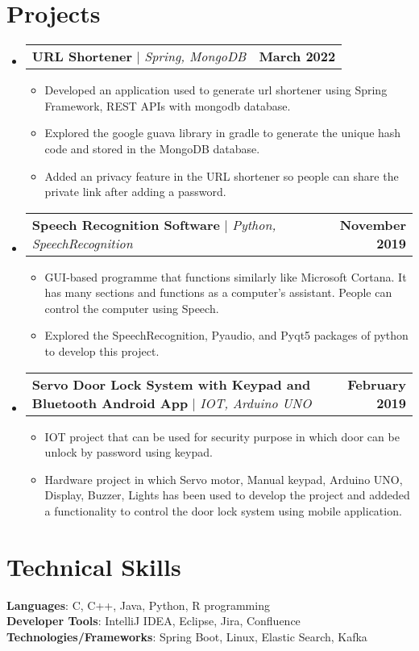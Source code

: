 \documentclass[letterpaper,11pt]{article}
\makeatletter
\newcommand{\resumeItem}[1]{
  \item\small{
    {#1 \vspace{-2pt}}
  }
}
\newcommand{\resumeProjectHeading}[2]{
    \item
    \begin{tabular*}{1.001\textwidth}{l@{\extracolsep{\fill}}r}
      \small#1 & \textbf{\small #2}\\
    \end{tabular*}\vspace{-7pt}
}
\newcommand{\resumeSubHeadingListStart}{\begin{itemize}[leftmargin=0.0in, label={}]}
\newcommand{\resumeSubHeadingListEnd}{\end{itemize}}
\newcommand{\resumeItemListStart}{\begin{itemize}}
\newcommand{\resumeItemListEnd}{\end{itemize}\vspace{-5pt}}
\makeatother
\begin{document}
\section{Projects}
    \vspace{-5pt}
    \resumeSubHeadingListStart
      \resumeProjectHeading
          {\textbf{URL Shortener} $|$ \emph{Spring, MongoDB}}{March 2022}
          \resumeItemListStart
            \resumeItem{Developed an application used to generate url shortener using Spring Framework, REST APIs with mongodb database.}
            \resumeItem{Explored the google guava library in gradle to generate the unique hash code and stored in the MongoDB database.}
            \resumeItem{Added an privacy feature in the URL shortener so people can share the private link after adding a password.}
          \resumeItemListEnd
          \vspace{-13pt}
      \resumeProjectHeading
          {\textbf{Speech Recognition Software} $|$ \emph{Python, SpeechRecognition }}{November 2019}
          \resumeItemListStart
            \resumeItem{GUI-based programme that functions similarly like Microsoft Cortana. It has many sections and functions as a computer's assistant. People can control the computer using Speech.}
            \resumeItem{Explored the SpeechRecognition, Pyaudio, and Pyqt5 packages of python to develop this project.}
          \resumeItemListEnd 
          \vspace{-13pt}
          \resumeProjectHeading
          {\textbf{Servo Door Lock System with Keypad and Bluetooth Android App} $|$ \emph{IOT, Arduino UNO}}{February 2019}
          \resumeItemListStart
            \resumeItem{IOT project that can be used for security purpose in which door can be unlock by password using keypad.}
            \resumeItem{Hardware project in which Servo motor, Manual keypad, Arduino UNO, Display, Buzzer, Lights has been used to develop the project and addeded a functionality to control the door lock system using mobile application.}
          \resumeItemListEnd 
    \resumeSubHeadingListEnd
\vspace{-15pt}


%
\section{Technical Skills}
 \begin{itemize}[leftmargin=0.15in, label={}]
    \small{\item{
     \textbf{Languages}{: C, C++, Java, Python, R programming} \\
     \textbf{Developer Tools}{: IntelliJ IDEA, Eclipse, Jira, Confluence} \\
     \textbf{Technologies/Frameworks}{: Spring Boot, Linux, Elastic Search, Kafka} \\
    }}
 \end{itemize}
 \vspace{-16pt}
\end{document}
